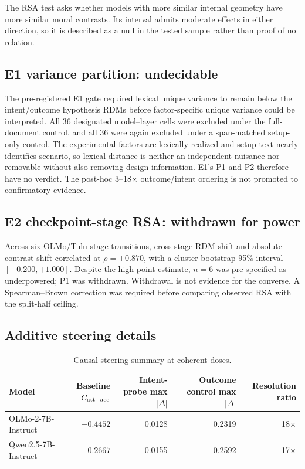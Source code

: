 The RSA test asks whether models with more similar internal geometry have more similar moral contrasts.
Its interval admits moderate effects in either direction, so it is described as a null in the tested sample rather than proof of no relation.

\subsection{E1 variance partition: undecidable}

The pre-registered E1 gate required lexical unique variance to remain below the intent/outcome hypothesis RDMs before factor-specific unique variance could be interpreted.
All 36 designated model--layer cells were excluded under the full-document control, and all 36 were again excluded under a span-matched setup-only control.
The experimental factors are lexically realized and setup text nearly identifies scenario, so lexical distance is neither an independent nuisance nor removable without also removing design information.
E1's P1 and P2 therefore have no verdict.
The post-hoc 3--18$\times$ outcome/intent ordering is not promoted to confirmatory evidence.

\subsection{E2 checkpoint-stage RSA: withdrawn for power}

Across six OLMo/Tulu stage transitions, cross-stage RDM shift and absolute contrast shift correlated at $\rho=+0.870$, with a cluster-bootstrap 95\% interval $[+0.200,+1.000]$.
Despite the high point estimate, $n=6$ was pre-specified as underpowered; P1 was withdrawn.
Withdrawal is not evidence for the converse.
A Spearman--Brown correction was required before comparing observed RSA with the split-half ceiling.

\subsection{Additive steering details}

\begin{table}[h]
\centering
\footnotesize
\caption{Causal steering summary at coherent doses.}
\label{tab:steering-summary}
\begin{tabularx}{\textwidth}{@{}Xrrrr@{}}
\toprule
Model & Baseline $C_{\mathrm{att-acc}}$ & Intent-probe max $|\Delta|$ & Outcome control max $|\Delta|$ & Resolution ratio \\
\midrule
OLMo-2-7B-Instruct & $-0.4452$ & 0.0128 & 0.2319 & 18$\times$ \\
Qwen2.5-7B-Instruct & $-0.2667$ & 0.0155 & 0.2592 & 17$\times$ \\
\bottomrule
\end{tabularx}
\end{table}


